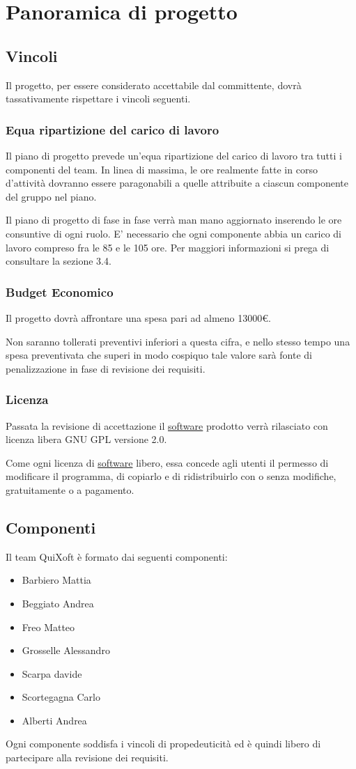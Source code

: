 \documentclass[11pt,a4paper]{article}
\begin{document}
\section{Panoramica di progetto}
\subsection{Vincoli}
Il progetto, per essere considerato accettabile dal committente, dovrà tassativamente rispettare i vincoli seguenti.
\subsubsection{Equa ripartizione del carico di lavoro}
Il piano di progetto prevede un'equa ripartizione del carico di lavoro tra tutti i componenti del team.
In linea di massima, le ore realmente fatte in corso d'attività dovranno essere paragonabili a quelle attribuite a ciascun componente del gruppo nel piano.

Il piano di progetto di fase in fase verrà man mano aggiornato inserendo le ore consuntive di ogni ruolo.
E' necessario che ogni componente abbia un carico di lavoro compreso fra le 85 e le 105 ore. Per maggiori informazioni si prega di consultare la sezione 3.4.
\subsubsection{Budget Economico}
Il progetto dovrà affrontare una spesa pari ad almeno 13000\euro.

Non saranno tollerati preventivi inferiori a questa cifra, e nello stesso tempo una spesa preventivata che superi in modo cospiquo tale valore sarà fonte di penalizzazione in fase di revisione dei requisiti.
\subsubsection{Licenza}
Passata la revisione di accettazione il \underline{software} prodotto verrà rilasciato con licenza libera GNU GPL versione 2.0.

Come ogni licenza di \underline{software} libero, essa concede agli utenti il permes\-so di modificare il programma, di copiarlo e di ridistribuirlo con o senza modifiche, gratuitamente o a pagamento.
\subsection{Componenti}
Il team QuiXoft è formato dai seguenti componenti:
\begin{itemize}
\item Barbiero Mattia
\item Beggiato Andrea
\item Freo Matteo
\item Grosselle Alessandro
\item Scarpa davide
\item Scortegagna Carlo
\item Alberti Andrea
\end{itemize}
Ogni componente soddisfa i vincoli di propedeuticità ed è quindi libero di partecipare alla revisione dei requisiti.
\end{document}
